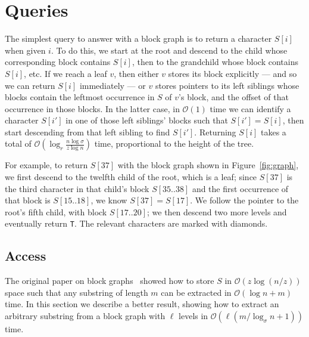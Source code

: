 \documentclass[12pt]{article}
\newcommand{\Oh}[1]
  {\ensuremath{\mathcal{O}\!\left({#1}\right)}}
\begin{document}
\section{Queries}
\label{sec:queries}

The simplest query to answer with a block graph is to return a character \(S [i]\) when given $i$.  To do this, we start at the root and descend to the child whose corresponding block contains \(S [i]\), then to the grandchild whose block contains \(S [i]\), etc.  If we reach a leaf $v$, then either $v$ stores its block explicitly --- and so we can return \(S [i]\) immediately --- or $v$ stores pointers to its left siblings whose blocks contain the leftmost occurrence in $S$ of $v$'s block, and the offset of that occurrence in those blocks.
In the latter case, in $\Oh{1}$ time we can identify a character \(S [i']\) in one of those left siblings' blocks such that \(S [i'] = S [i]\), then start descending from that left sibling to find \(S [i']\).  Returning \(S [i]\) takes a total of $\Oh{\log_r \frac{n \log \sigma}{z \log n}}$ time, proportional to the height of the tree.

For example, to return \(S [37]\) with the block graph shown in Figure~\ref{fig:graph}, we first descend to the twelfth child of the root, which is a leaf; since \(S [37]\) is the third character in that child's block \(S [35..38]\) and the first occurrence of that block is \(S [15..18]\), we know \(S [37] = S [17]\).  We follow the pointer to the root's fifth child, with block \(S [17..20]\); we then descend two more levels and eventually return {\tt T}.  The relevant characters are marked with diamonds.

\subsection{Access}
\label{subsec:access}

The original paper on block graphs~\cite{GGP11} showed how to store $S$ in $\Oh{z \log (n / z)}$ space such that any 
substring of length $m$ can be extracted in $\Oh{\log n + m}$ time. In this section we describe a better result, 
showing how to extract an arbitrary substring from a block graph with $\ell$ levels in $\Oh{\ell(m/\log_\sigma n+1)}$ time.
\end{document}
